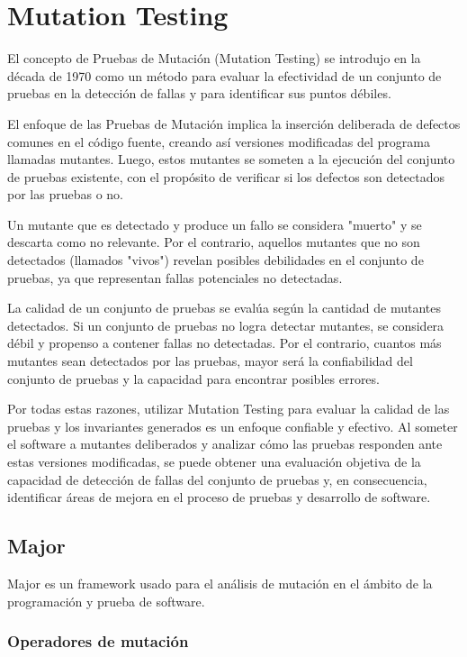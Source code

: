 \chapter{Mutation Testing}

El concepto de Pruebas de Mutación (Mutation Testing) se introdujo en la década de 1970 como un método para evaluar la efectividad de un conjunto de pruebas en la detección de fallas y para identificar sus puntos débiles.

El enfoque de las Pruebas de Mutación implica la inserción deliberada de defectos comunes en el código fuente, creando así versiones modificadas del programa llamadas mutantes. Luego, estos mutantes se someten a la ejecución del conjunto de pruebas existente, con el propósito de verificar si los defectos son detectados por las pruebas o no.

Un mutante que es detectado y produce un fallo se considera "muerto" y se descarta como no relevante. Por el contrario, aquellos mutantes que no son detectados (llamados "vivos") revelan posibles debilidades en el conjunto de pruebas, ya que representan fallas potenciales no detectadas.

La calidad de un conjunto de pruebas se evalúa según la cantidad de mutantes detectados. Si un conjunto de pruebas no logra detectar mutantes, se considera débil y propenso a contener fallas no detectadas. Por el contrario, cuantos más mutantes sean detectados por las pruebas, mayor será la confiabilidad del conjunto de pruebas y la capacidad para encontrar posibles errores.

Por todas estas razones, utilizar Mutation Testing para evaluar la calidad de las pruebas y los invariantes generados es un enfoque confiable y efectivo. Al someter el software a mutantes deliberados y analizar cómo las pruebas responden ante estas versiones modificadas, se puede obtener una evaluación objetiva de la capacidad de detección de fallas del conjunto de pruebas y, en consecuencia, identificar áreas de mejora en el proceso de pruebas y desarrollo de software.


\section{Major}

Major es un framework usado para el análisis de mutación en el ámbito de la programación y prueba de software.

\subsection{Operadores de mutación}


